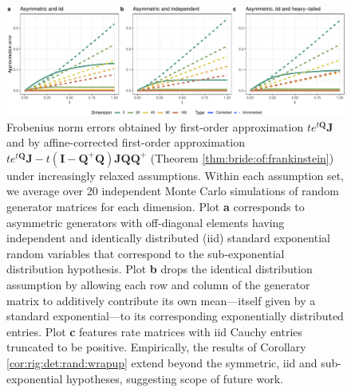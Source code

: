 \documentclass[12pt]{article}
\newcommand{\QQ}{\mathbf{Q}}
\newcommand{\JJ}{\mathbf{J}}
\newcommand{\II}{\mathbf{I}}
\begin{document}
\setcounter{figure}{0}
\begin{figure}[!t]
	\centering
	\includegraphics[width=\linewidth]{figures/appendixFig3.pdf}
	\caption{Frobenius norm errors obtained by first-order approximation $te^{t\QQ}\JJ$ and by affine-corrected first-order approximation
		$te^{t\QQ}\JJ - t(\II -\QQ^+ \QQ) \JJ \QQ \QQ^{+}$
		(Theorem \ref{thm:bride:of:frankinstein}) under increasingly relaxed
		assumptions.  Within each assumption set, we average over 20
		independent Monte Carlo simulations of random generator matrices
		for each dimension. Plot \textbf{a} corresponds to asymmetric
		generators with off-diagonal elements having independent and
		identically distributed (iid) standard exponential random
		variables that correspond to the sub-exponential distribution
		hypothesis. Plot \textbf{b} drops the identical distribution
		assumption by allowing each row and column of the generator
		matrix to additively contribute its own mean---itself given by a
		standard exponential---to its corresponding exponentially
		distributed entries. Plot \textbf{c} features rate
		matrices with iid Cauchy entries truncated to be
		positive. Empirically, the results of
		Corollary \ref{cor:rig:det:rand:wrapup} extend beyond the symmetric,
		iid and sub-exponential hypotheses, suggesting scope of future work.}
	\label{fig:app}
\end{figure}
\end{document}
